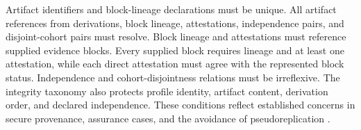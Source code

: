 \documentclass[11pt,a4paper]{article}
\begin{document}
Artifact identifiers and block-lineage declarations must be unique. All
artifact references from derivations, block lineage, attestations,
independence pairs, and disjoint-cohort pairs must resolve. Block lineage and
attestations must reference supplied evidence blocks. Every supplied block
requires lineage and at least one attestation, while each direct attestation
must agree with the represented block status. Independence and
cohort-disjointness relations must be irreflexive. The integrity taxonomy also
protects profile identity, artifact content, derivation order, and declared
independence. These conditions reflect established concerns in secure
provenance, assurance cases, and the avoidance of pseudoreplication
\citep{hasan2009provenance,mohamad2021assurance,lazic2010pseudoreplication}.
\end{document}
